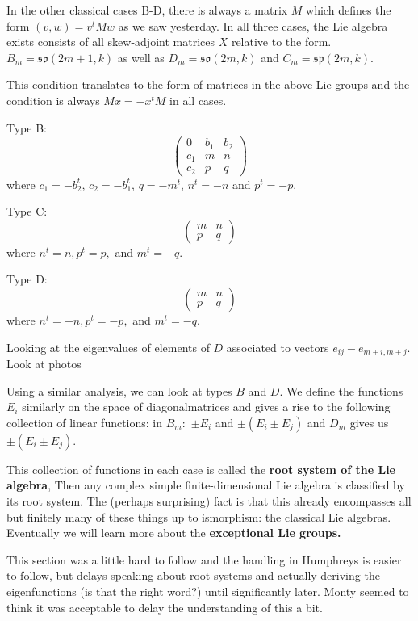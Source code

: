 \documentclass[12pt]{article}
\theoremstyle{nonumberbreak}
\theoremstyle{changebreak}
\theoremstyle{nonumberbreak}
\theoremstyle{change}
\begin{document}
In the other classical cases B-D, there is always a matrix $M$ which defines the form $(v,w)=v^tMw$ 
as we saw yesterday. In all three cases, the Lie algebra exists consists of all skew-adjoint matrices
$X$ relative to the form. $B_m=\mathfrak{so}(2m+1,k)$ as well as $D_m=\mathfrak{so}(2m,k)$ and $C_m=\mathfrak{sp}(2m,k)$.

This condition translates to the form of matrices in the above Lie groups and the condition is always $Mx=-x^tM$ in all cases.

Type B:
\[\begin{pmatrix}
	0 & b_1 & b_2\\
	c_1 & m & n\\
	c_2 & p & q
\end{pmatrix}\]
where $c_1=-b_2^t$, $c_2=-b_1^t$, $q=-m^t$, $n^t=-n$ and $p^t=-p$.

Type C:
\[\begin{pmatrix}
	m& n\\ p & q
\end{pmatrix}\]
where $n^t=n, p^t=p,$ and $m^t=-q$.

Type D:
\[\begin{pmatrix}
	m& n\\ p & q
\end{pmatrix}\]
where $n^t=-n, p^t=-p,$ and $m^t=-q$.

Looking at the eigenvalues of elements of $D$ associated to vectors $e_{ij}-e_{m+i,m+j}$. Look at photos

Using a similar analysis, we can look at types $B$ and $D$. We define the functions $E_i$ similarly on the space of diagonalmatrices and gives a rise to the following collection of linear functions:
in $B_m:$ $\pm E_i$ and $\pm(E_i\pm E_j)$ and $D_m$ gives us $\pm(E_i\pm E_j)$.

This collection of functions in each case is called the \textbf{root system of the Lie algebra},
Then any complex simple finite-dimensional Lie algebra is classified by its root system.
The (perhaps surprising) fact is that this already encompasses all but finitely many of these
things up to ismorphism: the classical Lie algebras. Eventually we will learn more about the
\textbf{exceptional Lie groups.}

This section was a little hard to follow and the handling in Humphreys is easier to follow, 
but delays speaking about root systems and actually deriving the eigenfunctions (is that the right word?)
until significantly later. Monty seemed to think it was acceptable to delay the understanding of this a bit.
\end{document}
